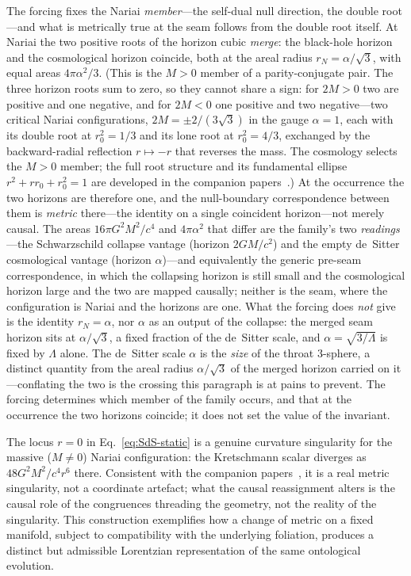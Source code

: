 \documentclass[11pt,a4paper]{article}
\theoremstyle{plain}
\theoremstyle{definition}
\theoremstyle{remark}
\begin{document}
The forcing fixes the Nariai \emph{member}---the self-dual null direction, the double root---and what is metrically true at the seam follows from the double root itself. At Nariai the two positive roots of the horizon cubic \emph{merge}: the black-hole horizon and the cosmological horizon coincide, both at the areal radius $r_{N}=\alpha/\sqrt3$, with equal areas $4\pi\alpha^2/3$. (This is the $M>0$ member of a parity-conjugate pair. The three horizon roots sum to zero, so they cannot share a sign: for $2M>0$ two are positive and one negative, and for $2M<0$ one positive and two negative---two critical Nariai configurations, $2M=\pm2/(3\sqrt3)$ in the gauge $\alpha=1$, each with its double root at $r_0^2=1/3$ and its lone root at $r_0^2=4/3$, exchanged by the backward-radial reflection $r\mapsto-r$ that reverses the mass. The cosmology selects the $M>0$ member; the full root structure and its fundamental ellipse $r^2+rr_0+r_0^2=1$ are developed in the companion papers~\cite{JanzenSlicing,JanzenGroupoid}.) At the occurrence the two horizons are therefore one, and the null-boundary correspondence between them is \emph{metric} there---the identity on a single coincident horizon---not merely causal. The areas $16\pi G^2M^2/c^4$ and $4\pi\alpha^2$ that differ are the family's two \emph{readings}---the Schwarzschild collapse vantage (horizon $2GM/c^2$) and the empty de~Sitter cosmological vantage (horizon $\alpha$)---and equivalently the generic pre-seam correspondence, in which the collapsing horizon is still small and the cosmological horizon large and the two are mapped causally; neither is the seam, where the configuration is Nariai and the horizons are one. What the forcing does \emph{not} give is the identity $r_{N}=\alpha$, nor $\alpha$ as an output of the collapse: the merged seam horizon sits at $\alpha/\sqrt3$, a fixed fraction of the de~Sitter scale, and $\alpha=\sqrt{3/\Lambda}$ is fixed by $\Lambda$ alone. The de~Sitter scale $\alpha$ is the \emph{size} of the throat $3$-sphere, a distinct quantity from the areal radius $\alpha/\sqrt3$ of the merged horizon carried on it---conflating the two is the crossing this paragraph is at pains to prevent. The forcing determines which member of the family occurs, and that at the occurrence the two horizons coincide; it does not set the value of the invariant.

The locus $r=0$ in Eq.~\eqref{eq:SdS-static} is a genuine curvature singularity for the massive ($M\neq0$) Nariai configuration: the Kretschmann scalar diverges as $48G^2M^2/c^4r^6$ there. Consistent with the companion papers~\cite{JanzenBHcausality,JanzenCircle}, it is a real metric singularity, not a coordinate artefact; what the causal reassignment alters is the causal role of the congruences threading the geometry, not the reality of the singularity. This construction exemplifies how a change of metric on a fixed manifold, subject to compatibility with the underlying foliation, produces a distinct but admissible Lorentzian representation of the same ontological evolution.
\end{document}
